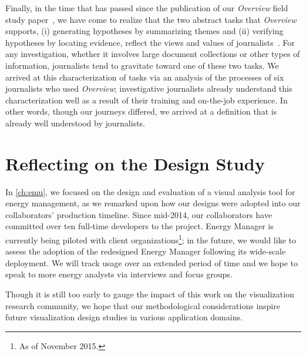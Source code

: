 Finally, in the time that has passed since the publication of our {\it Overview} field study paper~\cite{Brehmer2014}, we have come to realize that the two abstract tasks that {\it Overview} supports, (i) generating hypotheses by summarizing themes and (ii) verifying hypotheses by locating evidence, reflect the views and values of journalists~\cite{Hermida2016}.
For any investigation, whether it involves large document collections or other types of information, journalists tend to gravitate toward one of these two tasks. 
We arrived at this characterization of tasks via an analysis of the processes of six journalists who used {\it Overview}; investigative journalists already understand this characterization well as a result of their training and on-the-job experience.
In other words, though our journeys differed, we arrived at a definition that is already well understood by journalists.


\section{Reflecting on the Design Study}
\label{conclusions:emu}


In \autoref{ch:emu}, we focused on the design and evaluation of a visual analysis tool for energy management, as we remarked upon how our designs were adopted into our collaborators' production timeline.
Since mid-2014, our collaborators have committed over ten full-time developers to the project.
Energy Manager is currently being piloted with client organizations\footnote{As of November 2015.}; in the future, we would like to assess the adoption of the redesigned Energy Manager following its wide-scale deployment. 
We will track usage over an extended period of time and we hope to speak to more energy analysts via interviews and focus groups.

Though it is still too early to gauge the impact of this work on the visualization research community, we hope that our methodological considerations inspire future visualization design studies in various application domains.

